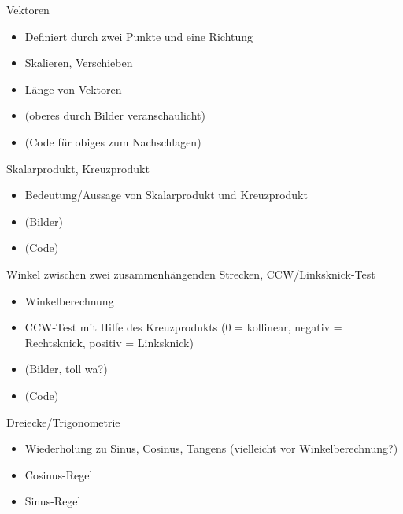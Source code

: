 \begin{frame}{Vektoren}
	\begin{itemize}
		\item Definiert durch zwei Punkte und eine Richtung
		\item Skalieren, Verschieben
		\item Länge von Vektoren
		\item (oberes durch Bilder veranschaulicht)
		\item (Code für obiges zum Nachschlagen)
	\end{itemize}
\end{frame}

\begin{frame}{Skalarprodukt, Kreuzprodukt}
	\begin{itemize}
		\item Bedeutung/Aussage von Skalarprodukt und Kreuzprodukt
		\item (Bilder)
		\item (Code)
	\end{itemize}
\end{frame}

\begin{frame}{Winkel zwischen zwei zusammenhängenden Strecken, CCW/Linksknick-Test}
	\begin{itemize}
		\item Winkelberechnung
		\item CCW-Test mit Hilfe des Kreuzprodukts (0 = kollinear, negativ = Rechtsknick, positiv = Linksknick)
		\item (Bilder, toll wa?)
		\item (Code)
	\end{itemize}
\end{frame}

\begin{frame}{Dreiecke/Trigonometrie}
	\begin{itemize}
		\item Wiederholung zu Sinus, Cosinus, Tangens (vielleicht vor Winkelberechnung?)
		\item Cosinus-Regel 
		\item Sinus-Regel
	\end{itemize}
\end{frame}
